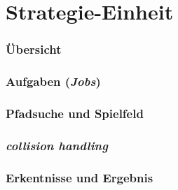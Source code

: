\section{Strategie-Einheit}

\begin{frame}
	\frametitle{Übersicht}
	
\end{frame}

\begin{frame}
	\frametitle{Aufgaben (\textit{Jobs})}
	
\end{frame}

\begin{frame}
	\frametitle{Pfadsuche und Spielfeld}
	
\end{frame}

\begin{frame}
	\frametitle{\textit{collision handling}}
	
\end{frame}

\begin{frame}
	\frametitle{Erkentnisse und Ergebnis}
	
\end{frame}